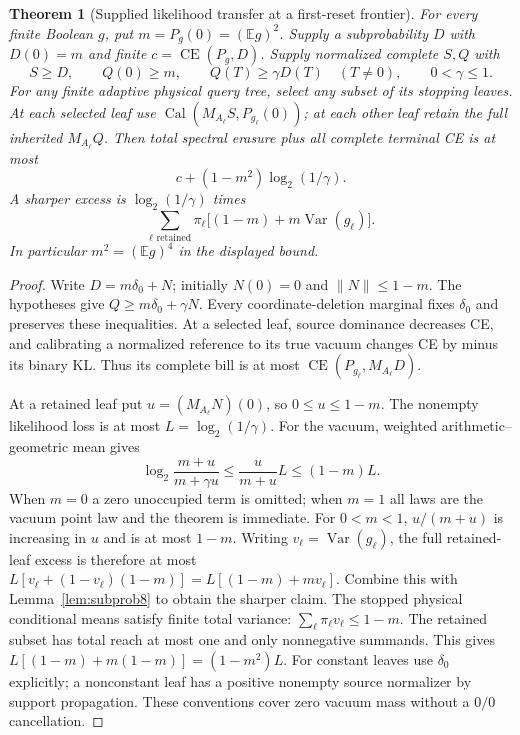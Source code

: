 \documentclass[11pt]{article}
\newtheorem{theorem}[lemma]{Theorem}
\newcommand{\E}{\mathbb E}
\newcommand{\CE}{\operatorname{CE}}
\begin{document}
\begin{theorem}[Supplied likelihood transfer at a first-reset frontier]
\label{thm:floorfront8}
For every finite Boolean $g$, put $m=P_g(0)=(\E g)^2$.
Supply a subprobability $D$ with $D(0)=m$ and finite
$c=\CE(P_g,D)$. Supply normalized complete $S,Q$ with
\[
S\ge D,\qquad Q(0)\ge m,\qquad
Q(T)\ge\gamma D(T)\quad(T\ne0),\qquad 0<\gamma\le1.
\]
For any finite adaptive physical query tree, select any subset of
its stopping leaves. At each selected leaf use
$\operatorname{Cal}(M_{A_\ell}S,P_{g_\ell}(0))$; at each other leaf retain
the full inherited $M_{A_\ell}Q$. Then total spectral erasure plus
all complete terminal CE is at most
\[
c+(1-m^2)\log_2(1/\gamma).
\]
A sharper excess is $\log_2(1/\gamma)$ times
\[
\sum_{\ell\text{ retained}}\pi_\ell
\bigl[(1-m)+m\operatorname{Var}(g_\ell)\bigr].
\]
In particular $m^2=(\E g)^4$ in the displayed bound.
\end{theorem}
\begin{proof}
Write $D=m\delta_0+N$; initially $N(0)=0$ and $\|N\|\le1-m$.
The hypotheses give $Q\ge m\delta_0+\gamma N$.
Every coordinate-deletion marginal fixes $\delta_0$ and preserves
these inequalities. At a selected leaf, source dominance decreases
CE, and calibrating a normalized reference to its true vacuum changes
CE by minus its binary KL. Thus its complete bill is at most
$\CE(P_{g_\ell},M_{A_\ell}D)$.

At a retained leaf put $u=(M_{A_\ell}N)(0)$, so $0\le u\le1-m$.
The nonempty likelihood loss is at most $L=\log_2(1/\gamma)$.
For the vacuum, weighted arithmetic--geometric mean gives
\[
\log_2\frac{m+u}{m+\gamma u}
\le \frac{u}{m+u}L\le(1-m)L.
\]
When $m=0$ a zero unoccupied term is omitted; when $m=1$ all laws
are the vacuum point law and the theorem is immediate. For $0<m<1$,
$u/(m+u)$ is increasing in $u$ and is at most $1-m$.
Writing $v_\ell=\operatorname{Var}(g_\ell)$, the full retained-leaf
excess is therefore at most
$L[v_\ell+(1-v_\ell)(1-m)]=L[(1-m)+mv_\ell]$.
Combine this with Lemma~\ref{lem:subprob8} to obtain the sharper claim.
The stopped physical conditional means satisfy finite total variance:
$\sum_\ell\pi_\ell v_\ell\le1-m$. The retained subset has total
reach at most one and only nonnegative summands. This gives
$L[(1-m)+m(1-m)]=(1-m^2)L$.
For constant leaves use $\delta_0$ explicitly; a nonconstant leaf has
a positive nonempty source normalizer by support propagation. These
conventions cover zero vacuum mass without a $0/0$ cancellation.
\end{proof}
\end{document}
